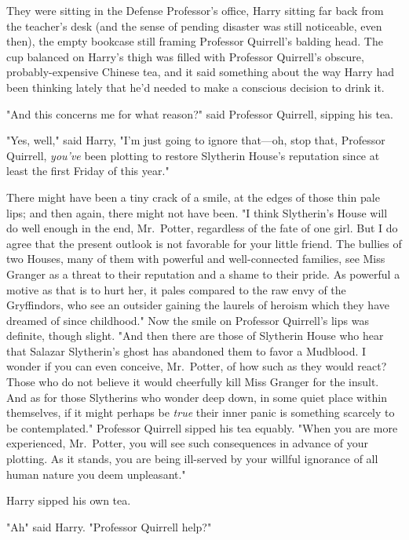 They were sitting in the Defense Professor's office, Harry sitting far back
from the teacher's desk (and the sense of pending disaster was still
noticeable, even then), the empty bookcase still framing Professor Quirrell's
balding head. The cup balanced on Harry's thigh was filled with Professor
Quirrell's obscure, probably-expensive Chinese tea, and it said something about
the way Harry had been thinking lately that he'd needed to make a conscious
decision to drink it.

"And this concerns me for what reason?" said Professor Quirrell, sipping his
tea.

"Yes, well," said Harry, "I'm just going to ignore that---oh, stop that,
Professor Quirrell, \emph{you've} been plotting to restore Slytherin House's
reputation since at least the first Friday of this year."

There might have been a tiny crack of a smile, at the edges of those thin pale
lips; and then again, there might not have been. "I think Slytherin's House
will do well enough in the end, Mr.~Potter, regardless of the fate of one girl.
But I do agree that the present outlook is not favorable for your little
friend. The bullies of two Houses, many of them with powerful and
well-connected families, see Miss Granger as a threat to their reputation and a
shame to their pride. As powerful a motive as that is to hurt her, it pales
compared to the raw envy of the Gryffindors, who see an outsider gaining the
laurels of heroism which they have dreamed of since childhood." Now the smile
on Professor Quirrell's lips was definite, though slight. "And then there are
those of Slytherin House who hear that Salazar Slytherin's ghost has abandoned
them to favor a Mudblood. I wonder if you can even conceive, Mr.~Potter, of how
such as they would react? Those who do not believe it would cheerfully kill
Miss Granger for the insult. And as for those Slytherins who wonder deep down,
in some quiet place within themselves, if it might perhaps be
\emph{true{\el}} their inner panic is something scarcely to be
contemplated." Professor Quirrell sipped his tea equably. "When you are more
experienced, Mr.~Potter, you will see such consequences in advance of your
plotting. As it stands, you are being ill-served by your willful ignorance of
all human nature you deem unpleasant."

Harry sipped his own tea.

"Ah{\el}" said Harry. "Professor Quirrell{\el} help?"

